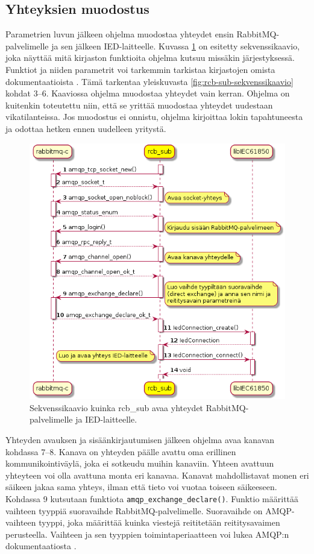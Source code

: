 \subsection{Yhteyksien muodostus}
Parametrien luvun jälkeen ohjelma muodostaa yhteydet ensin RabbitMQ-palvelimelle ja sen jälkeen IED-laitteelle. Kuvassa \ref{fig:rcb-sub-open-connections} on esitetty sekvenssikaavio, joka näyttää mitä kirjaston funktioita ohjelma kutsuu missäkin järjestyksessä. Funktiot ja niiden parametrit voi tarkemmin tarkistaa kirjastojen omista dokumentaatioista \cite{libIEC61850-doc} \cite{rabbitmq-c-repo}. Tämä tarkentaa yleiskuvasta \ref{fig:rcb-sub-sekvenssikaavio} kohdat 3--6. Kaaviossa ohjelma muodostaa yhteydet vain kerran. Ohjelma on kuitenkin toteutettu niin, että se yrittää muodostaa yhteydet uudestaan vikatilanteissa. Jos muodostus ei onnistu, ohjelma kirjoittaa lokin tapahtuneesta ja odottaa hetken ennen uudelleen yritystä.

\begin{figure}[ht!]
	\includegraphics[width=1\textwidth]{pictures/rcb-sub-open-connections.png}
	\caption{Sekvenssikaavio kuinka rcb\_sub avaa yhteydet RabbitMQ-palvelimelle ja IED-laitteelle.}
	\label{fig:rcb-sub-open-connections}
\end{figure}

Yhteyden avauksen ja sisäänkirjautumisen jälkeen ohjelma avaa kanavan kohdassa 7--8. Kanava on yhteyden päälle avattu oma erillinen kommunikointiväylä, joka ei sotkeudu muihin kanaviin. Yhteen avattuun yhteyteen voi olla avattuna monta eri kanavaa. Kanavat mahdollistavat monen eri säikeen jakaa sama yhteys, ilman että tieto voi vuotaa toiseen säikeeseen. Kohdassa 9 kutsutaan funktiota \texttt{amqp\_exchange\_declare()}. Funktio määrittää vaihteen tyyppiä suoravaihde RabbitMQ-palvelimelle. Suoravaihde on AMQP-vaihteen tyyppi, joka määrittää kuinka viestejä reititetään reititysavaimen perusteella. Vaihteen ja sen tyyppien toimintaperiaatteen voi lukea AMQP:n dokumentaatiosta \cite[s.~26--28]{AMQP-specification}.


